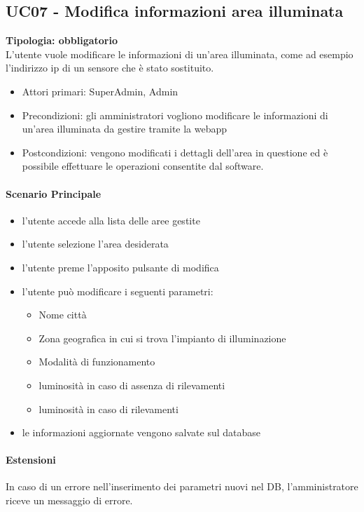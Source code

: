 \documentclass[12pt]{article}
\begin{document}
\subsection{UC07 - Modifica informazioni area illuminata}
\textbf{Tipologia: obbligatorio} \\
L'utente vuole modificare le informazioni di un'area illuminata, come ad esempio l'indirizzo ip di un sensore che è stato sostituito.
\begin{itemize}
	\item Attori primari: SuperAdmin, Admin
	\item Precondizioni: gli amministratori vogliono modificare le informazioni di un'area illuminata da gestire tramite la webapp
	\item Postcondizioni: vengono modificati i dettagli dell'area in questione ed è possibile effettuare le operazioni consentite dal software.
\end{itemize}
\paragraph{Scenario Principale}
\begin{itemize}
	\item l'utente accede alla lista delle aree gestite
	\item l'utente selezione l'area desiderata
	\item l'utente preme l'apposito pulsante di modifica
	\item l'utente può modificare i seguenti parametri:
		\begin{itemize}
			\item Nome città
			\item Zona geografica in cui si trova l'impianto di illuminazione
			\item Modalità di funzionamento
			\item luminosità in caso di assenza di rilevamenti
			\item luminosità in caso di rilevamenti
		\end{itemize}
	\item le informazioni aggiornate vengono salvate sul database
\end{itemize}
\paragraph{Estensioni} In caso di un errore nell'inserimento dei parametri nuovi nel DB, l'amministratore riceve un messaggio di errore.
\end{document}
